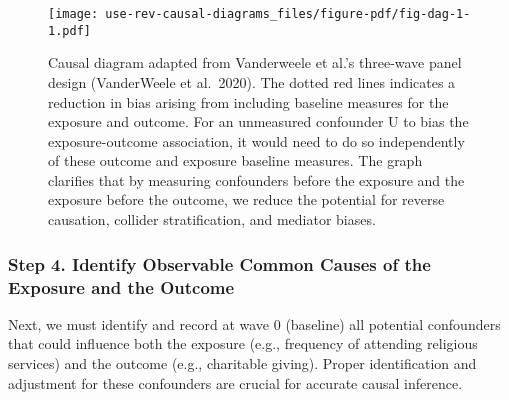 \documentclass[
  singlecolumn,
  9pt]{article}
\begin{document}
\begin{figure}

{\centering \texttt{[image: use-rev-causal-diagrams\_files/figure-pdf/fig-dag-1-1.pdf]}

}

\caption{\label{fig-dag-1}Causal diagram adapted from Vanderweele et
al.'s three-wave panel design (VanderWeele et al.~2020). The dotted red
lines indicates a reduction in bias arising from including baseline
measures for the exposure and outcome. For an unmeasured confounder U to
bias the exposure-outcome association, it would need to do so
independently of these outcome and exposure baseline measures. The graph
clarifies that by measuring confounders before the exposure and the
exposure before the outcome, we reduce the potential for reverse
causation, collider stratification, and mediator biases.}

\end{figure}

\subsubsection{Step 4. Identify Observable Common Causes of the Exposure
and the
Outcome}\label{step-4.-identify-observable-common-causes-of-the-exposure-and-the-outcome}

Next, we must identify and record at wave 0 (baseline) all potential
confounders that could influence both the exposure (e.g., frequency of
attending religious services) and the outcome (e.g., charitable giving).
Proper identification and adjustment for these confounders are crucial
for accurate causal inference.
\end{document}
